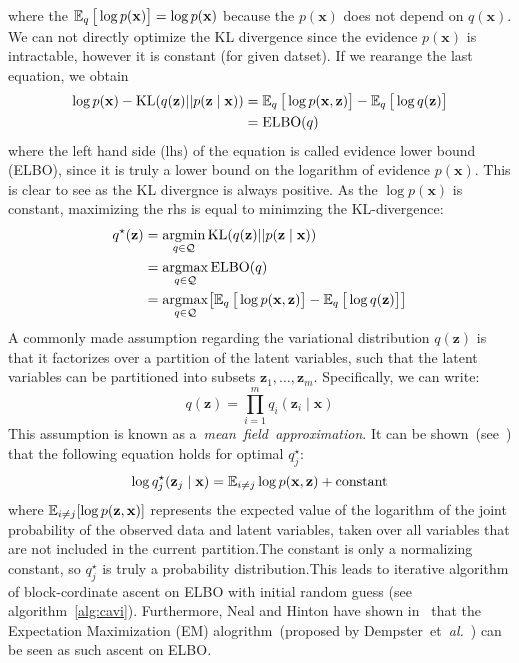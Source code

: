 where the $\operatorname{\mathbb{E}}_q \big[\log p(\mathbf{x})\big] = \log p(\mathbf{x})$ because the $p(\mathbf{x})$ does not depend on $q(\mathbf{x})$. 
We can not directly optimize the KL divergence since the evidence $p(\mathbf{x})$ is intractable, however it is constant (for given datset).
If we rearange the last equation, we obtain 
\begin{align}
\label{eq:elbo}
\log p(\mathbf{x}) - \mathrm{KL}(q(\mathbf{z}) || p(\mathbf{z} \mid  \mathbf{x})) &= \operatorname{\mathbb{E}}_q \big[\log p(\mathbf{x},\mathbf{z})\big] - \operatorname{\mathbb{E}}_q \big[\log q(\mathbf{z})\big] \\
    &= \mathrm{ELBO}(q) 
\end{align}
where the left hand side (lhs) of the equation is called evidence lower bound (ELBO), since it is truly a lower bound on the logarithm of evidence 
$p(\mathbf{x})$. This is clear to see as the KL divergnce is always positive. As the $\log p(\mathbf{x})$ is constant, maximizing the rhs is 
equal to minimzing the KL-divergence:
\begin{align*} 
    q^\star(\mathbf{z}) &= \mathop{\rm argmin}_{q \in \mathcal{Q}} \mathrm{KL}(q(\mathbf{z}) || p(\mathbf{z} \mid  \mathbf{x})) \\
                        &= \mathop{\rm argmax}_{q \in \mathcal{Q}} \mathrm{ELBO}(q) \\
                        &= \mathop{\rm argmax}_{q \in \mathcal{Q}} \bigl[ \operatorname{\mathbb{E}}_q \big[\log p(\mathbf{x},\mathbf{z})\big] - \operatorname{\mathbb{E}}_q \big[\log q(\mathbf{z})\big] \bigr]  \\
\end{align*}
A commonly made assumption regarding the variational distribution $q(\mathbf{z})$ is that it factorizes over a partition of the latent variables, 
such that the latent variables can be partitioned into subsets $\mathbf{z}_1,\dots,\mathbf{z}_m$. Specifically, we can write:
$$
q(\mathbf{z}) = \prod_{i=1}^m q_i(\mathbf{z}_i\mid \mathbf{x})
$$
This assumption is known as a~\textit{mean~field~approximation}. It can be shown~(see~\cite{intro-variational-blog-2019}) that the following 
equation holds for optimal $q^\star_j$: 
$$
\log q^\star_j(\mathbf{z}_j\mid \mathbf{x}) = \operatorname{\mathbb{E}}_{i \neq j} \log p(\mathbf{x},\mathbf{z}) + \text{constant}
$$
where $\operatorname{\mathbb{E}}_{{i\neq j}}[\log p({\mathbf {z}},{\mathbf {x}})]$ represents the expected value of the logarithm of the joint probability 
of the observed data and latent variables, taken over all variables that are not included in the current partition.The constant is 
only a normalizing constant, so $q^\star_j$ is truly a probability distribution.This leads to iterative 
algorithm of block-cordinate ascent on ELBO with initial random guess (see algorithm~\ref{alg:cavi}). Furthermore, Neal and Hinton
have shown in~\cite{em-as-vb-1998} that the Expectation Maximization (EM) alogrithm~(proposed by Dempster~et~\textit{al.}~\cite{em-alg-1977}) 
can be seen as such ascent on ELBO. 

